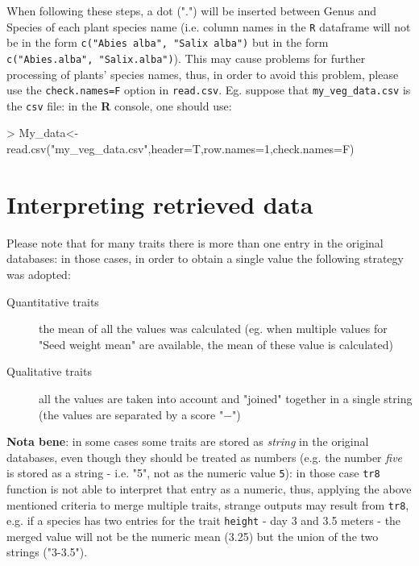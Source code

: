 \documentclass{article}
\begin{document}
  When following these steps, a dot (".") will be inserted between
Genus and Species of each plant species name (i.e. column names in the
\texttt{R} dataframe will not be in the form \texttt{c("Abies alba", "Salix
alba")} but in the form  \texttt{c("Abies.alba", "Salix.alba")}).
This may cause problems for further processing of plants'
species names, thus, in order to avoid this problem, please use the \texttt{check.names=F}
  option in \texttt{read.csv}. Eg. suppose that
  \texttt{my\_veg\_data.csv} is the \texttt{csv} file: in the
  \textbf{R} console, one should use:

\begin{Schunk}
\begin{Sinput}
> My_data<-read.csv("my_veg_data.csv",header=T,row.names=1,check.names=F)
\end{Sinput}
\end{Schunk}


\section{Interpreting retrieved data}
\label{sec:interpreting}

Please note that for many traits there is more than one entry in the
original databases: in those cases, in order to obtain a single value
the following strategy was adopted:

\begin{description}
\item[Quantitative traits] the mean of all the values was calculated
  (eg. when multiple values for "Seed weight mean" are available, the
  mean of these value is calculated)
\item[Qualitative traits] all the values are taken into account and
  "joined" together in a single string (the values are separated by a
  score "$-$")
\end{description}

\textbf{Nota bene}: in some cases some traits are stored as \textit{string} in the original databases, even though they should be treated as numbers (e.g. the number \textit{five} is stored as a string - i.e. "5", not as the numeric value \texttt{5}): in those case \texttt{tr8} function is not able to interpret that entry as a numeric, thus, applying the above mentioned criteria to merge multiple traits, strange outputs may result from \texttt{tr8}, e.g. if a species has two entries for the trait \texttt{height} - day 3 and 3.5 meters - the merged value will not be the numeric mean (3.25) but the union of the two strings ("3-3.5").
\end{document}
